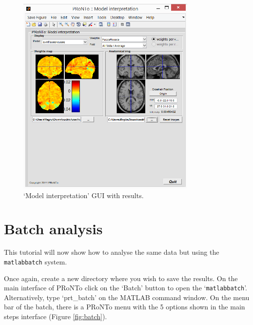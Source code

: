 \begin{itemize}
\begin{figure}[h!]
	\centering
		\includegraphics[height=10cm]{images/Tutorial/classification/modelInterpretation.png}
	\caption{`Model interpretation' GUI with results.}
	\label{fig:modelInterpretation}
\end{figure}
	
\end{itemize}





\section{Batch analysis}
\label{sec:Batch_analysis_svm}

This tutorial will now show how to analyse the same data but using the {\tt matlabbatch} system.

Once again, create a new directory where you wish to save the results. On the main interface of PRoNTo click on the `Batch' button to open the `{\tt matlabbatch}'. Alternatively, type `prt\_batch' on the MATLAB command window. On the menu bar of the batch, there is a PRoNTo menu with the 5 options shown in the main steps interface (Figure \ref{fig:batch}).

